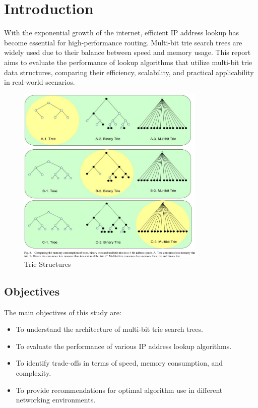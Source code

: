 \documentclass[12pt	]{article}
\begin{document}
\section{Introduction}
With the exponential growth of the internet, efficient IP address lookup has become essential for high-performance routing. Multi-bit trie search trees are widely used due to their balance between speed and memory usage. This report aims to evaluate the performance of lookup algorithms that utilize multi-bit trie data structures, comparing their efficiency, scalability, and practical applicability in real-world scenarios.


\begin{figure}[h!]
	\centering
	\includegraphics[width=0.8\textwidth]{Images/img2.png}
	\caption{Trie Structures}
	\label{fig:Trie Structures}
\end{figure}


\subsection{Objectives}
The main objectives of this study are:
\begin{itemize}
	\item To understand the architecture of multi-bit trie search trees.
	\item To evaluate the performance of various IP address lookup algorithms.
	\item To identify trade-offs in terms of speed, memory consumption, and complexity.
	\item To provide recommendations for optimal algorithm use in different networking environments.
\end{itemize}
\end{document}
